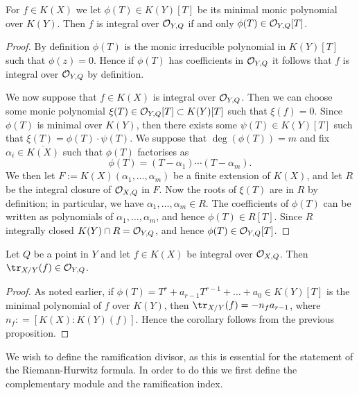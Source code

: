     \begin{prop}
    For $f\in K(X)$ we let $\phi(T)\in K(Y)[T]$ be its minimal monic polynomial over $K(Y)$.
    Then $f$ is integral over ${\cal O}_{Y,Q}$ if and only $\phi (T)\in {\cal O}_{Y,Q}[T]$.
    \end{prop}
    \begin{proof}
    By definition $\phi(T)$ is the monic irreducible polynomial in $K(Y)[T]$ such that $\phi(z) = 0$. 
    Hence if $\phi (T)$ has coefficients in ${\cal O}_{Y,Q}$ it follows that $f$ is integral over ${\cal O}_{Y,Q}$ by definition.
    
    We now suppose that $f\in K(X)$ is integral over ${\cal O}_{Y,Q}$.
    Then we can choose some monic polynomial $\xi(T)\in {\cal O}_{Y,Q}[T] \subset K(Y)[T]$ such that $\xi(f) = 0$.
    Since $\phi(T)$ is minimal over $K(Y)$, then there exists some $\psi(T)\in K(Y)[T]$ such that $ \xi(T) = \phi(T)\cdot \psi(T)$.
    We suppose that $\deg(\phi(T)) = m$ and fix $\alpha_i \in \overline{K(X)}$ such that $\phi(T)$ factorises as 
        \[  
        \phi(T) = (T-\alpha_1)\cdots (T-\alpha_m).
        \]
    We then let $F := K(X)(\alpha_1, \ldots, \alpha_m)$ be a finite extension of $K(X)$, and let $R$ be the integral closure of ${\cal O}_{X,Q}$ in $F$.
    Now the roots of $\xi(T)$ are in $R$ by definition; in particular, we have $\alpha_1, \ldots, \alpha_m \in R$.
    The coefficients of $\phi(T)$ can be written as polynomials of $\alpha_1, \ldots, \alpha_m$, and hence $\phi(T) \in R[T]$.
    Since $R$ integrally closed $K(Y)\cap R = {\cal O}_{Y,Q}$, and hence $\phi(T)\in {\cal O}_{Y,Q}[T]$.
    \end{proof}

    \begin{cor}\label{traceinclosure}
    Let $Q$ be a point in $Y$ and let $f\in K(X)$ be integral over ${\cal O}_{X,Q}$.
    Then $\tr_{X/Y}(f)\in \cO_{Y,Q}$.
    \end{cor}
    \begin{proof}
    As noted earlier, if $\phi(T)=T^r+a_{r-1}T^{r-1} + \ldots + a_0\in K(Y)[T]$ is the minimal polynomial of $f$ over $K(Y)$, then $\tr_{X/Y}(f)=-n_fa_{r-1}$, where $n_f : = [K(X):K(Y)(f)]$.
    Hence the corollary follows from the previous proposition.
    \end{proof}


We wish to define the ramification divisor, as this is essential for the statement of the Riemann-Hurwitz formula.
In order to do this we first define the complementary module and the ramification index.


